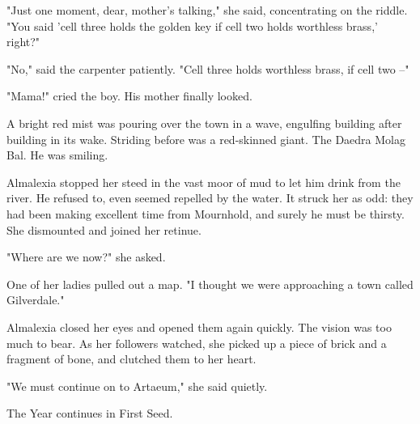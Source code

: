 "Just one moment, dear, mother's talking," she said, concentrating on the riddle. "You said 'cell three holds the golden key if cell two holds worthless brass,' right?"

"No," said the carpenter patiently. "Cell three holds worthless brass, if cell two --"

"Mama!" cried the boy. His mother finally looked.

A bright red mist was pouring over the town in a wave, engulfing building after building in its wake. Striding before was a red-skinned giant. The Daedra Molag Bal. He was smiling.

Almalexia stopped her steed in the vast moor of mud to let him drink from the river. He refused to, even seemed repelled by the water. It struck her as odd: they had been making excellent time from Mournhold, and surely he must be thirsty. She dismounted and joined her retinue.

"Where are we now?" she asked.

One of her ladies pulled out a map. "I thought we were approaching a town called Gilverdale."

Almalexia closed her eyes and opened them again quickly. The vision was too much to bear. As her followers watched, she picked up a piece of brick and a fragment of bone, and clutched them to her heart.

"We must continue on to Artaeum," she said quietly.

The Year continues in First Seed.